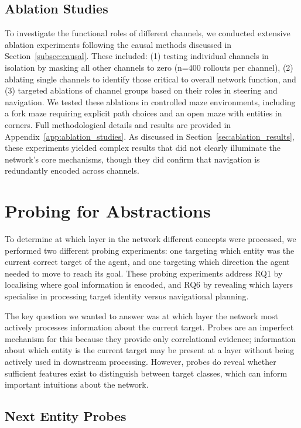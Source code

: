 \subsection{Ablation Studies}
\label{subsec:ablation_methodology}

To investigate the functional roles of different channels, we conducted extensive ablation experiments following the causal methods discussed in Section~\ref{subsec:causal}. These included: (1) testing individual channels in isolation by masking all other channels to zero (n=400 rollouts per channel), (2) ablating single channels to identify those critical to overall network function, and (3) targeted ablations of channel groups based on their roles in steering and navigation. We tested these ablations in controlled maze environments, including a fork maze requiring explicit path choices and an open maze with entities in corners. Full methodological details and results are provided in Appendix~\ref{app:ablation_studies}. As discussed in Section~\ref{sec:ablation_results}, these experiments yielded complex results that did not clearly illuminate the network's core mechanisms, though they did confirm that navigation is redundantly encoded across channels.

\section{Probing for Abstractions}\label{sec:probing_methods}
To determine at which layer in the network different concepts were processed, we performed two different probing experiments: one targeting which entity was the current correct target of the agent, and one targeting which direction the agent needed to move to reach its goal. These probing experiments address RQ1 by localising where goal information is encoded, and RQ6 by revealing which layers specialise in processing target identity versus navigational planning.

The key question we wanted to answer was at which layer the network most actively processes information about the current target. Probes are an imperfect mechanism for this because they provide only correlational evidence; information about which entity is the current target may be present at a layer without being actively used in downstream processing. However, probes do reveal whether sufficient features exist to distinguish between target classes, which can inform important intuitions about the network.

\subsection{Next Entity Probes}\label{subsec:next_entity_probes}

